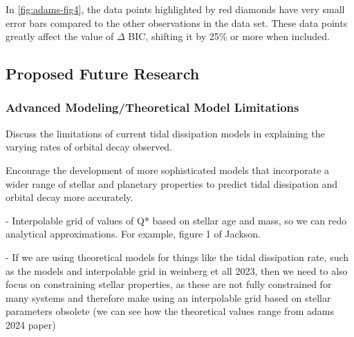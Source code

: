 \documentclass[oneside,12pt]{amsart}
\numberwithin{page}{section}
\begin{document}
In \ref{fig:adams-fig4}, the data points highlighted by red diamonds have very small error bars compared to the other observations in the data set. These data points greatly affect the value of $\Delta$ BIC, shifting it by 25\% or more when included.






\subsection{Proposed Future Research}

\subsubsection{Advanced Modeling/Theoretical Model Limitations}
Discuss the limitations of current tidal dissipation models in explaining the varying rates of orbital decay observed.

Encourage the development of more sophisticated models that incorporate a wider range of stellar and planetary properties to predict tidal dissipation and orbital decay more accurately.

- Interpolable grid of values of Q* based on stellar age and mass, so we can redo analytical approximations. For example, figure 1 of Jackson. 

- If we are using theoretical models for things like the tidal dissipation rate, such as the models and interpolable grid in weinberg et all 2023, then we need to also focus on constraining stellar properties, as these are not fully constrained for many systems and therefore make using an interpolable grid based on stellar parameters obsolete (we can see how the theoretical values range from adams 2024 paper)
\end{document}

